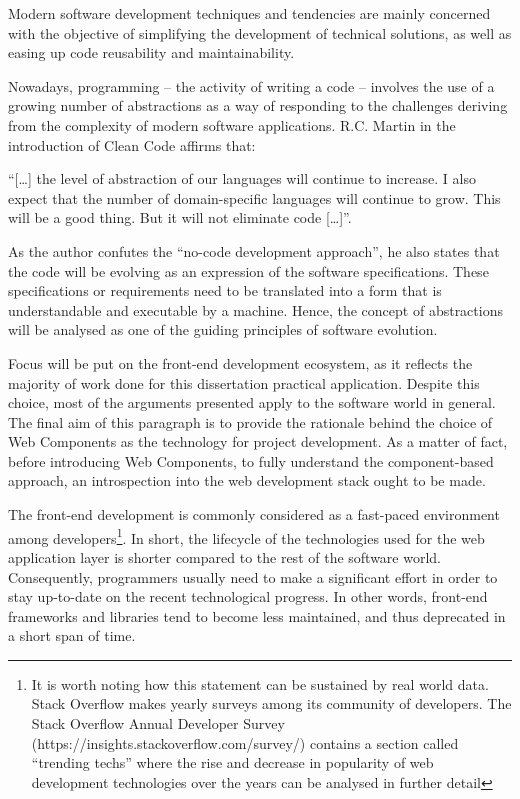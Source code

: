 Modern software development techniques and tendencies are mainly concerned with the objective of simplifying the development of technical solutions, as well as easing up code reusability and maintainability.

Nowadays, programming – the activity of writing a code – involves the use of a growing number of abstractions as a way of responding to the challenges deriving from the complexity of modern software applications. R.C. Martin in the introduction of Clean Code affirms that:

\begin{displayquote}

“[…] the level of abstraction of our languages will continue to increase. I also expect that the number of domain-specific languages will continue to grow. This will be a good thing. But it will not eliminate code […]”. 

\end{displayquote}

As the author confutes the “no-code development approach”, he also states that the code will be evolving as an expression of the software specifications. These specifications or requirements need to be translated into a form that is understandable and executable by a machine. Hence, the concept of abstractions will be analysed as one of the guiding principles of software evolution.

Focus will be put on the front-end development ecosystem, as it reflects the majority of work done for this dissertation practical application. Despite this choice, most of the arguments presented apply to the software world in general. The final aim of this paragraph is to provide the rationale behind the choice of Web Components as the technology for project development. As a matter of fact, before introducing Web Components, to fully understand the component-based approach, an introspection into the web development stack ought to be made.

The front-end development is commonly considered as a fast-paced environment among developers\footnote{It is worth noting how this statement can be sustained by real world data. Stack Overflow makes yearly surveys among its community of developers. The Stack Overflow Annual Developer Survey (https://insights.stackoverflow.com/survey/) contains a section called “trending techs” where the rise and decrease in popularity of web development technologies over the years can be analysed in further detail}. In short, the lifecycle of the technologies used for the web application layer is shorter compared to the rest of the software world. Consequently, programmers usually need to make a significant effort in order to stay up-to-date on the recent technological progress. In other words, front-end frameworks and libraries tend to become less maintained, and thus deprecated in a short span of time.

